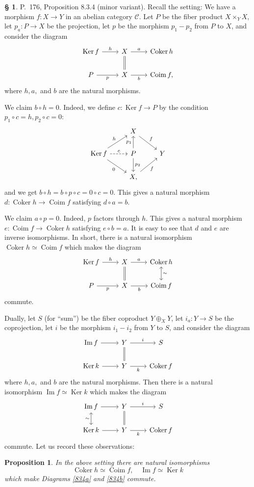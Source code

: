\documentclass[12pt]{article}%
\newtheorem{prop}[thm]{Proposition}
\theoremstyle{remark}
\theoremstyle{definition}
\newtheorem{s}[thm]{\S}%
\newcommand{\C}{\mathcal C}
\DeclareMathOperator{\Coim}{Coim}
\DeclareMathOperator{\Coker}{Coker}
\DeclareMathOperator{\Ima}{Im}
\DeclareMathOperator{\Ker}{Ker}
\begin{document}
\begin{s}%
P.~176, Proposition 8.3.4 (minor variant). Recall the setting: We have a morphism $f:X\to Y$ in an abelian category $\C$. Let $P$ be the fiber product $X\times_YX$, let $p_a:P\to X$ be the projection, let $p$ be the morphism $p_1-p_2$ from $P$ to $X$, and consider the diagram 
%
$$
\begin{tikzcd}
\Ker f\ar{r}{h}&X\ar[equal]{d}\ar{r}{a}&\Coker h\\ 
P\ar{r}[swap]{p}&X\ar{r}[swap]{b}&\Coim f,
\end{tikzcd}
$$ 
where $h,a,$ and $b$ are the natural morphisms. 

We claim $b\circ h=0$. Indeed, we define $c:\Ker f\to P$ by the condition $p_1\circ c=h,p_2\circ c=0$: 
$$
\begin{tikzcd}
{}&X\ar{dr}{f}\\ 
\Ker f\ar{ur}{h}\ar{dr}[swap]{0}\ar[dashed]{r}{c}&P\ar{u}{p_1}\ar{d}{p_2}&Y\\ 
{}&X\ar{ur}[swap]{f},
\end{tikzcd}
$$
and we get $b\circ h=b\circ p\circ c=0\circ c=0$. This gives a natural morphism $d:\Coker h\to\Coim f$ satisfying $d\circ a=b$. 

We claim $a\circ p=0$. Indeed, $p$ factors through $h$. This gives a natural morphism $e:\Coim f\to\Coker h$ satisfying $e\circ b=a$. It is easy to see that $d$ and $e$ are inverse isomorphisms. In short, there is a natural isomorphism $\Coker h\simeq\Coim f$ which makes the diagram
%
\begin{equation}\label{834a}
\begin{tikzcd}
\Ker f\ar{r}{h}&X\ar[equal]{d}\ar{r}{a}&\Coker h\ar[leftrightarrow]{d}{\sim}\\ 
P\ar{r}[swap]{p}&X\ar{r}[swap]{b}&\Coim f
\end{tikzcd}
\end{equation}
%
commute. 

Dually, let $S$ (for ``sum'') be the fiber coproduct $Y\oplus_XY$, let $i_a:Y\to S$ be the coprojection, let $i$ be the morphism $i_1-i_2$ from $Y$ to $S$, and consider the diagram 
%
$$
\begin{tikzcd}
\Ima f\ar{r}&Y\ar[equal]{d}\ar{r}{i}&S\\ 
\Ker k\ar{r}&Y\ar{r}[swap]{k}&\Coker f
\end{tikzcd}
$$ 
where $h,a,$ and $b$ are the natural morphisms. Then there is a natural isomorphism $\Ima f\simeq\Ker k$ which makes the diagram 
%
\begin{equation}\label{834b}
\begin{tikzcd}
\Ima f\ar[leftrightarrow]{d}[swap]{\sim}\ar{r}&Y\ar[equal]{d}\ar{r}{i}&S\\ 
\Ker k\ar{r}&Y\ar{r}[swap]{k}&\Coker f
\end{tikzcd}
\end{equation}
%
commute. Let us record these observations:
\begin{prop}\label{p834}
In the above setting there are natural isomorphisms 
$$
\Coker h\simeq\Coim f,\quad\Ima f\simeq\Ker k
$$ 
which make Diagrams \eqref{834a} and \eqref{834b} commute.
\end{prop}
\end{s}
\end{document}
